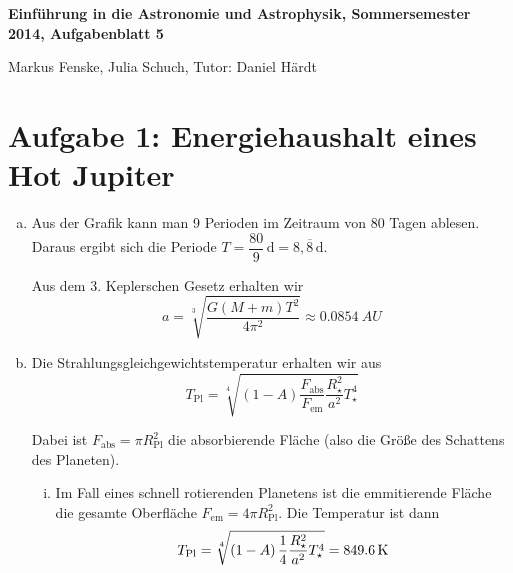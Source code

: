 \documentclass[a4paper,german,12pt,smallheadings]{scrartcl}
\begin{document}
\allowdisplaybreaks %
\begin{center}
\bfseries %
\sffamily %
\vspace{-40pt}
Einführung in die Astronomie und Astrophysik, Sommersemester 2014, Aufgabenblatt 5

Markus Fenske, Julia Schuch, Tutor: Daniel Härdt
\vspace{-10pt}
\end{center}
\section*{Aufgabe 1: Energiehaushalt eines Hot Jupiter}
\begin{enumerate}[a)]
  \item
    Aus der Grafik kann man 9 Perioden im Zeitraum von 80 Tagen ablesen. Daraus
    ergibt sich die Periode $T = \dfrac{80}{9}\,\mathrm{d} = 8{,}\overline{8}\,\mathrm{d}$.

    Aus dem 3. Keplerschen Gesetz erhalten wir
    \begin{equation}
      a = \sqrt[3]{
        \frac{G(M+m)T^2}{4 \pi^2}
      } \approx \SI{0.0854}{AU}
    \end{equation}
  \item
    Die Strahlungsgleichgewichtstemperatur erhalten wir aus
    \begin{equation}
      T_\text{Pl} = \sqrt[4]{
        (1-A) \frac{F_\text{abs}}{F_\text{em}} \frac{R_\star^2}{a^2} T_\star^4
      }
    \end{equation}

    Dabei ist $F_\text{abs} = \pi R_\text{Pl}^2$ die absorbierende Fläche (also
    die Größe des Schattens des Planeten).


    \begin{enumerate}[(i)]
      \item
        Im Fall eines schnell rotierenden Planetens ist die emmitierende
        Fläche die gesamte Oberfläche $F_\text{em} = 4 \pi R_\text{Pl}^2$. Die
        Temperatur ist dann
        \begin{equation}
          T_\text{Pl} = \sqrt[4]{
            \del{1-A} \frac{1}{4} \frac{R_\star^2}{a^2} T_\star^4
          } = \SI{849.6}{\kelvin}
        \end{equation}


\end{enumerate}
\end{enumerate}
\end{document}
